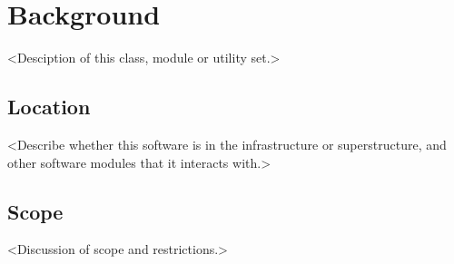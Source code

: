 
\section{Background}

<Desciption of this class, module or utility set.>

\subsection{Location}

<Describe whether this software is in the infrastructure or superstructure,
and other software modules that it interacts with.>

\subsection{Scope}

<Discussion of scope and restrictions.>





